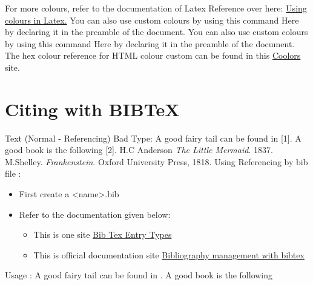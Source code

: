 \documentclass{report}
\theoremstyle{plain} %
\begin{document}
\vspace{4mm}
\newline
For more colours, refer to the documentation of Latex Reference over here: \href{https://www.overleaf.com/learn/latex/Using_colours_in_LaTeX}{ Using colours in Latex.}
\vspace{4mm}
\newline
You can also use custom colours by using this command \textcolor{mynewcolor}{Here} by declaring it in the preamble of the document.
\vspace{4mm}
\newline
You can also use custom colours by using this command \textcolor{nextcolor}{Here} by declaring it in the preamble of the document.
\vspace{4mm}
\newline
The hex colour reference for HTML colour custom can be found in this \href{https://coolors.co/655a7c-ab92bf-afc1d6-cef9f2-d6ca98}{Coolors} site.

\newpage
\section{Citing with BIBTeX}

Text (Normal - Referencing) Bad Type:
\vspace{4mm}
\newline
A good fairy tail can be found in [1]. A good book is the following [2].
\vspace{4mm}
\newline
[1] H.C Anderson \textit{The Little Mermaid}. 1837.
\vspace{4mm}
\newline
[2] M.Shelley. \textit{Frankenstein}. Oxford University Press, 1818.
\vspace{4mm}
\newline
Using Referencing by bib file : 
\begin{itemize}
    \item First create a <name>.bib
    \item Refer to the documentation given below:
    \begin{itemize}
        \item This is one site \href{https://www.bibtex.com/e/entry-types/}{Bib Tex Entry Types}
        \item This is official documentation site \href{https://www.overleaf.com/learn/latex/Bibliography_management_with_bibtex}{Bibliography management with bibtex}
    \end{itemize}
\end{itemize}
Usage : 
\newline
A good fairy tail can be found in \cite{anderson}. A good book is the following \cite{shelly}
\end{document}
